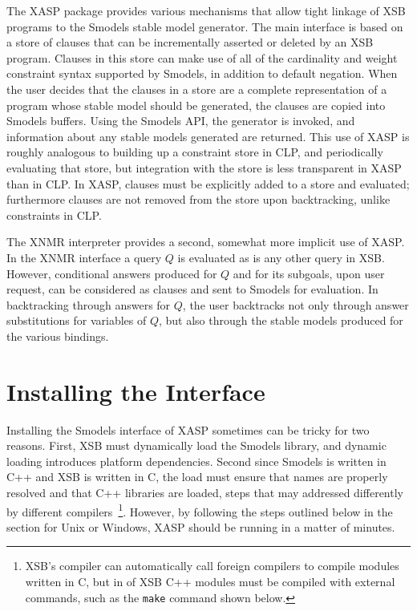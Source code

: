 The XASP package provides various mechanisms that allow tight linkage
of XSB programs to the Smodels \cite{smodels:engine} stable model
generator.  The main interface is based on a store of clauses that can
be incrementally asserted or deleted by an XSB program.  Clauses in
this store can make use of all of the cardinality and weight
constraint syntax supported by Smodels, in addition to default
negation.  When the user decides that the clauses in a store are a
complete representation of a program whose stable model should be
generated, the clauses are copied into Smodels buffers.  Using the
Smodels API, the generator is invoked, and information about any
stable models generated are returned.  This use of XASP is roughly
analogous to building up a constraint store in CLP, and periodically
evaluating that store, but integration with the store is less
transparent in XASP than in CLP.  In XASP, clauses must be explicitly
added to a store and evaluated; furthermore clauses are not removed
from the store upon backtracking, unlike constraints in CLP.

The XNMR interpreter provides a second, somewhat more implicit use of
XASP.  In the XNMR interface a query $Q$ is evaluated as is any other
query in XSB.  However, conditional answers produced for $Q$ and for
its subgoals, upon user request, can be considered as clauses and sent
to Smodels for evaluation.  In backtracking through answers for $Q$,
the user backtracks not only through answer substitutions for
variables of $Q$, but also through the stable models produced for the
various bindings. 

\section{Installing the Interface}

Installing the Smodels interface of XASP sometimes can be tricky for
two reasons.  First, XSB must dynamically load the Smodels library,
and dynamic loading introduces platform dependencies.  Second since
Smodels is written in C++ and XSB is written in C, the load must
ensure that names are properly resolved and that C++ libraries are
loaded, steps that may addressed differently by different
compilers~\footnote{XSB's compiler can automatically call foreign
  compilers to compile modules written in C, but in \version{} of XSB
  C++ modules must be compiled with external commands, such as the
  {\tt make} command shown below.}.  However, by following the steps
outlined below in the section for Unix or Windows, XASP should be
running in a matter of minutes.

